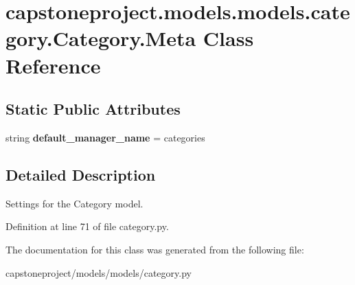 \hypertarget{classcapstoneproject_1_1models_1_1models_1_1category_1_1_category_1_1_meta}{}\section{capstoneproject.\+models.\+models.\+category.\+Category.\+Meta Class Reference}
\label{classcapstoneproject_1_1models_1_1models_1_1category_1_1_category_1_1_meta}
\subsection*{Static Public Attributes}
\begin{DoxyCompactItemize}
\item 
\mbox{\label{classcapstoneproject_1_1models_1_1models_1_1category_1_1_category_1_1_meta_a129b25dd26b7b24896732efe4ee85399}} 
string {\bfseries default\+\_\+manager\+\_\+name} = \textquotesingle{}categories\textquotesingle{}
\end{DoxyCompactItemize}


\subsection{Detailed Description}
\begin{DoxyVerb}Settings for the Category model.\end{DoxyVerb}
 

Definition at line 71 of file category.\+py.



The documentation for this class was generated from the following file\+:\begin{DoxyCompactItemize}
\item 
capstoneproject/models/models/category.\+py\end{DoxyCompactItemize}
